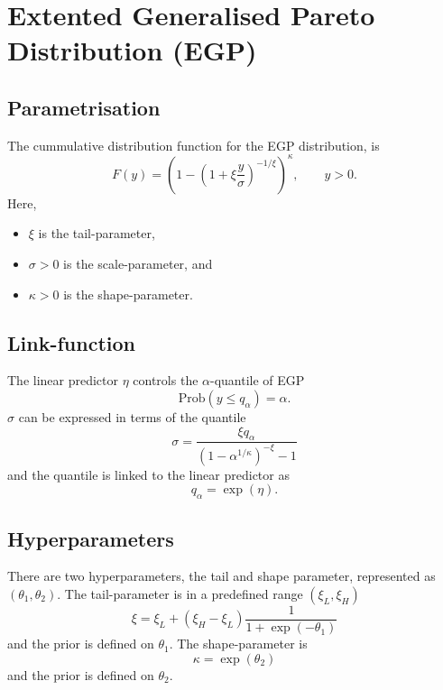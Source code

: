 \documentclass[a4paper,11pt]{article}
\begin{document}
\section*{Extented Generalised Pareto Distribution (EGP)}

\subsection*{Parametrisation}

The cummulative distribution function for the EGP distribution, is
\begin{displaymath}
    F(y) = \left(1-\left(1 + \xi
\frac{y}{\sigma}\right)^{-1/\xi}\right)^{\kappa},  \qquad y >0.
\end{displaymath}
Here, 
\begin{itemize}
\item $\xi$ is the tail-parameter,
\item $\sigma > 0$ is the scale-parameter, and
\item $\kappa > 0$ is the shape-parameter.
\end{itemize}

\subsection*{Link-function}

The linear predictor $\eta$ controls the $\alpha$-quantile of EGP
\begin{displaymath}
    \text{Prob}(y \le q_\alpha)=\alpha.
\end{displaymath}
$\sigma$ can be expressed in terms of the quantile
\begin{displaymath}
    \sigma = \frac{\xi q_\alpha}{(1-\alpha^{1/\kappa})^{-\xi} -1}
\end{displaymath}
and the quantile is linked to the linear predictor as
\begin{displaymath}
    q_\alpha = \exp(\eta).
\end{displaymath}

\subsection*{Hyperparameters}

There are two hyperparameters, the tail and shape parameter,
 represented as $(\theta_1, \theta_2)$. The tail-parameter is in a
predefined range $(\xi_L, \xi_H)$
\begin{displaymath}
    \xi = \xi_L + (\xi_H - \xi_L) \frac{1}{1+\exp(-\theta_1)}
\end{displaymath}
and the prior is defined on $\theta_1$. The shape-parameter is
\begin{displaymath}
    \kappa = \exp(\theta_2)
\end{displaymath}
and the prior is defined on $\theta_2$.
\end{document}
